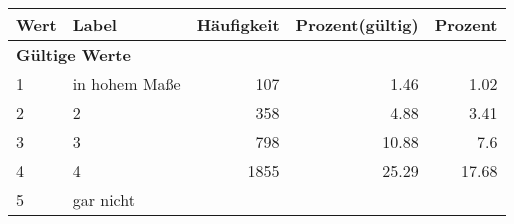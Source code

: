      \begin{longtable}{lXrrr}
     \toprule
     \textbf{Wert} & \textbf{Label} & \textbf{Häufigkeit} & \textbf{Prozent(gültig)} & \textbf{Prozent} \\
     \endhead
     \midrule
     \multicolumn{5}{l}{\textbf{Gültige Werte}}\\

     1 &
     \multicolumn{1}{X}{ in hohem Maße   } &


       \num{107} &
       \num[round-mode=places,round-precision=2]{1,46} &
         \num[round-mode=places,round-precision=2]{1,02} \\

     2 &
     \multicolumn{1}{X}{ 2   } &


       \num{358} &
       \num[round-mode=places,round-precision=2]{4,88} &
         \num[round-mode=places,round-precision=2]{3,41} \\

     3 &
     \multicolumn{1}{X}{ 3   } &


       \num{798} &
       \num[round-mode=places,round-precision=2]{10,88} &
         \num[round-mode=places,round-precision=2]{7,6} \\

     4 &
     \multicolumn{1}{X}{ 4   } &


       \num{1855} &
       \num[round-mode=places,round-precision=2]{25,29} &
         \num[round-mode=places,round-precision=2]{17,68} \\

     5 &
     \multicolumn{1}{X}{ gar nicht   } &



\end{longtable}
